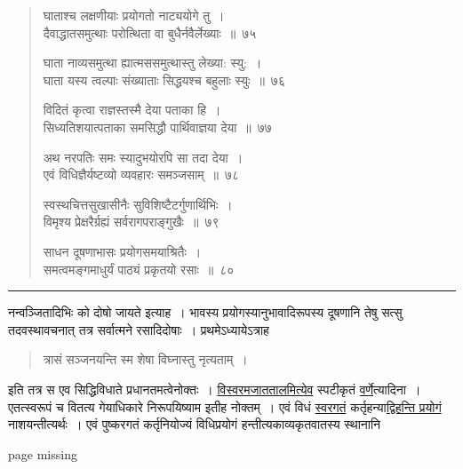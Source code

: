 \documentclass[11pt, openany]{book}
\begin{document}
\begin{quote}
{\na घाताश्च लक्षणीयाः प्रयोगतो नाट्ययोगे तु~।\\
दैवाद्धातसमुत्थाः परोत्थिता वा बुधैर्नवैर्लेख्याः~॥~७५

घाता नाव्यसमुत्था ह्यात्मससमुत्थास्तु लेख्या: स्यु:~।\\
घाता यस्य त्वल्पाः संख्याताः सिद्धयश्च बहुलाः स्युः~॥~७६

विदितं कृत्वा राज्ञस्तस्मै देया पताका हि~।\\
सिध्यतिशयात्पताका समसिद्धौ पार्थिवाज्ञया देया~॥~७७

अथ नरपतिः समः स्यादुभयोरपि सा तदा देया~।\\
एवं विधिज्ञैर्यष्टव्यो व्यवहारः समञ्जसाम्~॥~७८

स्वस्थचित्तसुखासीनैः सुविशिष्टैटर्गुणार्थिभिः~।\\
विमृश्य प्रेक्षरैर्ग्रह्यं सर्वरागपराङ्गुखैः~॥~७९

साधन दूषणाभासः प्रयोगसमयाश्रितैः~।\\
समत्वमङ्गमाधुर्यं पाठ्यं प्रकृतयो रसाः~॥~८०}
\end{quote}

\hrule

\vspace{2mm}
नन्वञ्जितादिभिः को दोषो जायते इत्याह~। भावस्य प्रयोगस्यानुभावादिरूपस्य दूषणानि तेषु सत्सु तदवस्थावचनात् तत्र सर्वात्मने रसादिदोषाः~। प्रथमेऽध्यायेऽत्राह\textendash

\begin{quote}
{\qt त्रासं सञ्जनयन्ति स्म शेषा विघ्नास्तु नृत्यताम्~।}
\end{quote}

\noindent
इति तत्र स एव सिद्धिविधाते प्रधानतमत्वेनोक्तः~। \underline{विस्वरमजाततालमित्येव} स्पटीकृतं \underline{वर्णे}त्यादिना~। एतत्स्वरूपं च वितत्य गेयाधिकारे निरूपयिष्याम इतीह नोक्तम्~। एवं विधं \underline{स्वरगतं} कर्तृहन्या\underline{द्विहन्ति प्रयोगं} नाशयन्तीत्यर्थः~। एवं पुष्करगतं कर्तृनियोज्यं विधिप्रयोगं हन्तीत्यकाव्यकृतवातस्य स्थानानि

\newpage
page missing

\newpage
\end{document}
